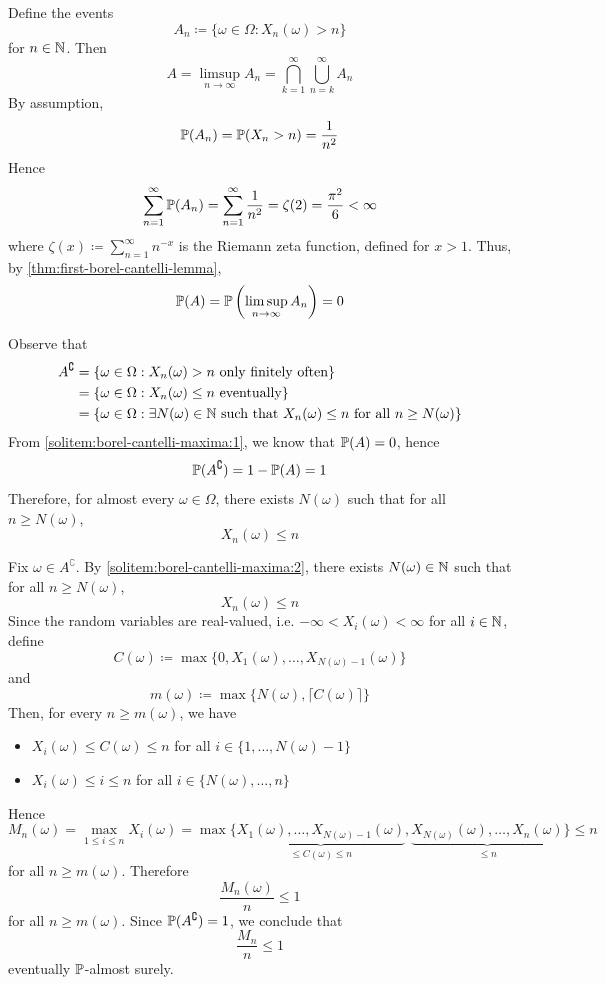 \begin{solution}
\leavevmode
\begin{enumerate}[label={\protect\hyperref[exitem:borel-cantelli-maxima:\arabic*]{(\alph*)}}]
\item \label{solitem:borel-cantelli-maxima:1}
Define the events
\[
A_n
\coloneq
\{\omega \in \Omega : X_n(\omega)>n\}
\]
for $n \in \mathbb{N}$.
Then
\[
A
=
\limsup_{n \to \infty} A_n
=
\bigcap_{k=1}^{\infty} \bigcup_{n=k}^{\infty} A_n
\]
By assumption,
\[
\mathbb{P}(A_n)
=
\mathbb{P}(X_n>n)
=
\frac{1}{n^2}
\]
Hence
\[
\sum_{n=1}^{\infty} \mathbb{P}(A_n)
=
\sum_{n=1}^{\infty} \frac{1}{n^2}
=
\zeta(2)
=
\frac{\pi^2}{6}
<
\infty
\]
where \(\zeta(x) \coloneq \sum_{n=1}^{\infty} n^{-x}\) is the Riemann zeta function, defined for \(x>1\).
Thus, by \autoref{thm:first-borel-cantelli-lemma},
\[
\mathbb{P}(A)
=
\mathbb{P}\left(\limsup_{n \to \infty} A_n\right)
=
0
\]

\item \label{solitem:borel-cantelli-maxima:2}
Observe that
\[
\begin{aligned}
A^{\complement}
&=
\{\omega \in \Omega : X_n(\omega)>n \text{ only finitely often}\} \\
&=
\{\omega \in \Omega : X_n(\omega) \le n \text{ eventually}\} \\
&=
\{\omega \in \Omega : \exists N(\omega) \in \mathbb{N} \text{ such that }  X_n(\omega) \le n \text{ for all } n \ge N(\omega)\}
\end{aligned}
\]
From \ref{solitem:borel-cantelli-maxima:1}, we know that \(\mathbb{P}(A)=0\), hence
\[
\mathbb{P}(A^{\complement})
=
1-\mathbb{P}(A)
=
1
\]
Therefore, 
for almost every \(\omega \in \Omega\), 
there exists \(N(\omega)\) such that for all \(n \ge N(\omega)\),
\[
X_n(\omega) \le n
\]

\item \label{solitem:borel-cantelli-maxima:3}
Fix \(\omega \in A^{\complement}\).
By \ref{solitem:borel-cantelli-maxima:2}, there exists \(N(\omega) \in \mathbb{N}\) such that for all \(n \ge N(\omega)\),
\[
X_n(\omega) \le n
\]
Since the random variables are real-valued, i.e. $-\infty < X_i(\omega) < \infty$ for all $i \in \mathbb{N}$, define
\[
C(\omega)
\coloneq
\max\{0,X_1(\omega),\dots,X_{N(\omega)-1}(\omega)\}
\]
and
\[
m(\omega)
\coloneq
\max\{N(\omega),\lceil C(\omega)\rceil\}
\]
Then, for every \(n \ge m(\omega)\), we have
\begin{itemize}
\item
\(
X_i(\omega) \le C(\omega) \le n
\)
for all \(i \in \{1,\dots,N(\omega)-1\}\)
\item
\(
X_i(\omega) \le i \le n
\)
for all \(i \in \{N(\omega),\dots,n\}\)
\end{itemize}
Hence
\[
M_n(\omega)
=
\max_{1 \le i \le n} X_i(\omega)
=
\max\{\underbrace{X_1(\omega),\dots,X_{N(\omega)-1}(\omega)}_{\le C(\omega) \le n},\underbrace{X_{N(\omega)}(\omega),\dots,X_n(\omega)}_{\le n}\}
\le
n
\]
for all \(n \ge m(\omega)\).
Therefore
\[
\frac{M_n(\omega)}{n} \le 1
\]
for all \(n \ge m(\omega)\).
Since \(\mathbb{P}(A^{\complement})=1\), we conclude that
\[
\frac{M_n}{n} \le 1
\]
eventually $\mathbb{P}$-almost surely.


\end{enumerate}
\end{solution}
